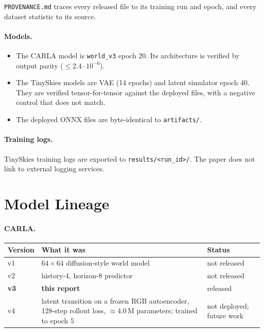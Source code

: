 \documentclass[11pt]{article}
\begin{document}
\texttt{PROVENANCE.md} traces every released file to its training run and epoch, and every dataset statistic to its source.

\paragraph{Models.}
\begin{itemize}
  \item The CARLA model is \texttt{world\_v3} epoch 20. Its architecture is verified by output parity ($\le 2.4\cdot10^{-6}$).
  \item The TinySkies models are VAE (14 epochs) and latent simulator epoch 40. They are verified tensor-for-tensor against the deployed files, with a negative control that does not match.
  \item The deployed ONNX files are byte-identical to \texttt{artifacts/}.
\end{itemize}

\paragraph{Training logs.} TinySkies training logs are exported to \texttt{results/<run\_id>/}. The paper does not link to external logging services.

\section{Model Lineage}
\label{app:lineage}

\paragraph{CARLA.}\leavevmode\par\smallskip

{\small\noindent\begin{tabularx}{\linewidth}{@{}l Y l@{}}
    \toprule
    Version & What it was & Status \\
    \midrule
    v1 & $64\times64$ diffusion-style world model & not released \\
    v2 & history-4, horizon-8 predictor & not released \\
    \textbf{v3} & \textbf{this report} & released \\
    v4 & latent transition on a frozen RGB autoencoder, 128-step rollout loss, $\approx$4.0\,M parameters; trained to epoch 5 & not deployed; future work \\
    \bottomrule
  \end{tabularx}\par}
\end{document}
